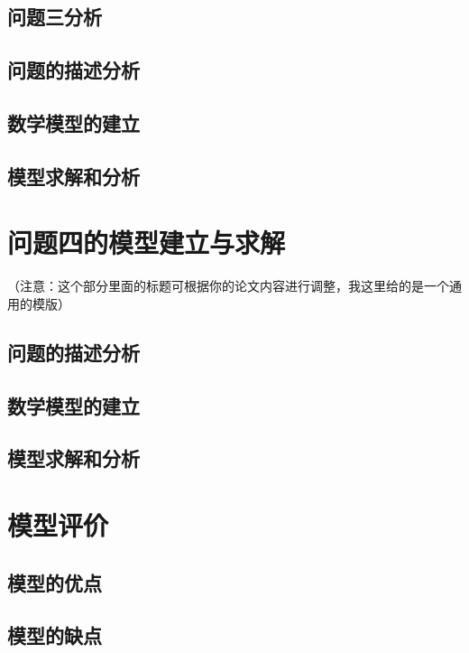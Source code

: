 \documentclass[a4paper,10pt]{my_paper}
\numberwithin{equation}{section}
\begin{document}
\subsection{问题三分析}

\subsection{问题的描述分析}

\subsection{数学模型的建立}

\subsection{模型求解和分析}

\section{问题四的模型建立与求解}
（注意：这个部分里面的标题可根据你的论文内容进行调整，我这里给的是一个通用的模版）

\subsection{问题的描述分析}

\subsection{数学模型的建立}

\subsection{模型求解和分析}

\section{模型评价}

\subsection{模型的优点}

\subsection{模型的缺点}
\end{document}
